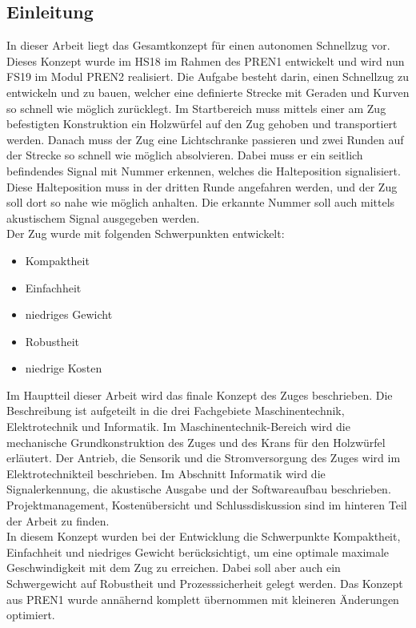 \documentclass[../../main.tex]{subfiles}
\begin{document}
\subsection{Einleitung}
In dieser Arbeit liegt das Gesamtkonzept für einen autonomen Schnellzug vor. Dieses Konzept wurde im HS18 im Rahmen des PREN1 entwickelt und wird nun FS19 im Modul PREN2 realisiert. Die Aufgabe besteht darin, einen Schnellzug zu entwickeln und zu bauen, welcher eine definierte Strecke mit Geraden und Kurven so schnell wie möglich zurücklegt. Im Startbereich muss mittels einer am Zug befestigten Konstruktion ein Holzwürfel auf den Zug gehoben und transportiert werden. Danach muss der Zug eine Lichtschranke passieren und zwei Runden auf der Strecke so schnell wie möglich absolvieren. Dabei muss er ein seitlich befindendes Signal mit Nummer erkennen, welches die Halteposition signalisiert. Diese Halteposition muss in der dritten Runde angefahren werden, und der Zug soll dort so nahe wie möglich anhalten. Die erkannte Nummer soll auch mittels akustischem Signal ausgegeben werden. \\
Der Zug wurde mit folgenden Schwerpunkten entwickelt:
\begin{itemize}
    \item Kompaktheit
    \item Einfachheit
    \item niedriges Gewicht
    \item Robustheit
    \item niedrige Kosten
\end{itemize}
Im Hauptteil dieser Arbeit wird das finale Konzept des Zuges beschrieben. Die Beschreibung ist aufgeteilt in die drei
Fachgebiete Maschinentechnik, Elektrotechnik und Informatik. Im Maschinentechnik-Bereich wird die mechanische
Grundkonstruktion des Zuges und des Krans für den Holzwürfel erläutert. Der Antrieb, die Sensorik und die
Stromversorgung des Zuges wird im Elektrotechnikteil beschrieben. Im Abschnitt Informatik wird die Signalerkennung, die
akustische Ausgabe und der Softwareaufbau beschrieben. Projektmanagement, Kostenübersicht und Schlussdiskussion sind im hinteren Teil der Arbeit zu finden.\\
In diesem Konzept wurden bei der Entwicklung die Schwerpunkte Kompaktheit, Einfachheit und niedriges Gewicht berücksichtigt, um eine optimale maximale Geschwindigkeit mit dem Zug zu erreichen. Dabei soll aber auch ein Schwergewicht auf Robustheit und Prozesssicherheit gelegt werden. Das Konzept aus PREN1 wurde annähernd komplett übernommen mit kleineren Änderungen optimiert.
\end{document}
